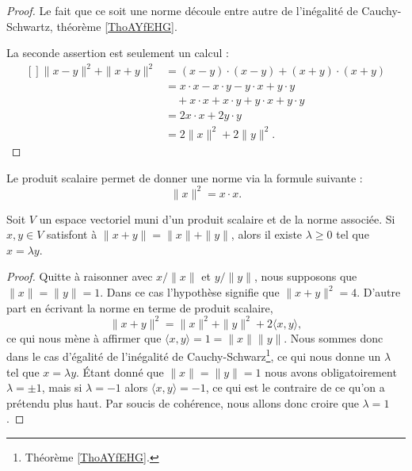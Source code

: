 \begin{proof}
    Le fait que ce soit une norme découle entre autre de l'inégalité de Cauchy-Schwartz, théorème \ref{ThoAYfEHG}.

    La seconde assertion est seulement un calcul :
			\begin{equation}
				\begin{aligned}[]
					\| x-y \|^2+\| x+y \|^2&=(x-y)\cdot (x-y)+(x+y)\cdot(x+y)\\
					&=x\cdot x-x\cdot y-y\cdot x+y\cdot y\\
					&\quad +x\cdot x+x\cdot y+y\cdot x+y\cdot y\\
					&=2x\cdot x+2y\cdot y\\
					&=2\| x \|^2+2\| y \|^2.
				\end{aligned}
			\end{equation}
\end{proof}

Le produit scalaire permet de donner une norme via la formule suivante :
\begin{equation}
    \| x \|^2=x\cdot x.
\end{equation}

\begin{lemma}   \label{LemLPOHUme}
    Soit \( V\) un espace vectoriel muni d'un produit scalaire et de la norme associée. Si \( x,y\in V\) satisfont à \( \| x+y \|=\| x \|+\| y \|\), alors il existe \( \lambda\geq 0\) tel que \( x=\lambda y\).
\end{lemma}

\begin{proof}
    Quitte à raisonner avec \( x/\| x \|\) et \( y/\| y \|\), nous supposons que \( \| x \|=\| y \|=1\). Dans ce cas l'hypothèse signifie que \( \| x+y \|^2=4\). D'autre part en écrivant la norme en terme de produit scalaire,
    \begin{equation}
        \| x+y \|^2=\| x \|^2+\| y \|^2+2\langle x, y\rangle ,
    \end{equation}
    ce qui nous mène à affirmer que \( \langle x, y\rangle =1=\| x \|\| y \|\). Nous sommes donc dans le cas d'égalité de l'inégalité de Cauchy-Schwarz\footnote{Théorème \ref{ThoAYfEHG}.}, ce qui nous donne un \( \lambda\) tel que \( x=\lambda y\). Étant donné que \( \| x \|=\| y \|=1\) nous avons obligatoirement \( \lambda=\pm 1\), mais si \( \lambda=-1\) alors \( \langle x, y\rangle =-1\), ce qui est le contraire de ce qu'on a prétendu plus haut. Par soucis de cohérence, nous allons donc croire que \( \lambda=1\).
\end{proof}

